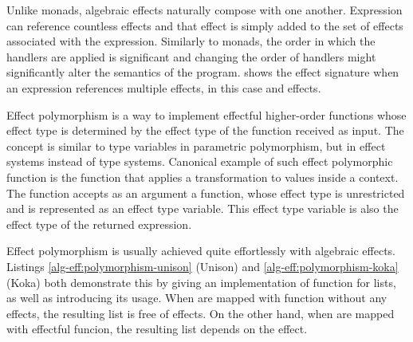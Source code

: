 Unlike monads, algebraic effects naturally compose with one another. Expression can reference countless effects and that effect is simply added to the set of effects associated with the expression. Similarly to monads, the order in which the handlers are applied is significant  and changing the order of handlers might significantly alter the semantics of the program.  shows the effect signature when an expression references multiple effects, in this case  and  effects.



Effect polymorphism is a way to implement effectful higher-order functions whose effect type is determined by the effect type of the function received as input. The concept is similar to type variables in parametric polymorphism, but in effect systems instead of type systems. Canonical example of such effect polymorphic function is the  function that applies a transformation to values inside a context. The  function accepts as an argument a function, whose effect type is unrestricted and is represented as an effect type variable. This effect type variable is also the effect type of the returned expression.



Effect polymorphism is usually achieved quite effortlessly with algebraic effects. Listings \ref{alg-eff:polymorphism-unison} (Unison) and \ref{alg-eff:polymorphism-koka} (Koka) both demonstrate this by giving an implementation of  function for lists, as well as introducing its usage. When  are mapped with function without any effects, the resulting list  is free of effects. On the other hand, when  are mapped with effectful funcion, the resulting list  depends on the  effect. 





